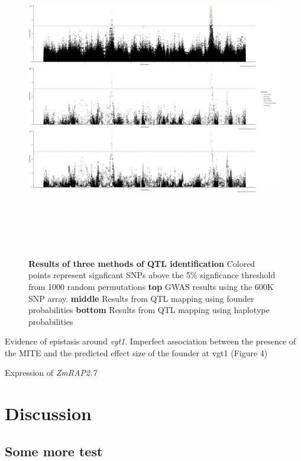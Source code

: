 \documentclass[article,9pt,twocolumn,twoside]{rilabRxiv}
\begin{document}
\begin{figure}[hb!]
\includegraphics[width=\textwidth,height=14cm]{figures/Methods_Fig3.png}
\caption{\textbf{Results of three methods of QTL identification} Colored points represent signficant SNPs above the 5\% signficance threshold from 1000 random permutations \textbf{top} GWAS results using the 600K SNP array. \textbf{middle} Results from QTL mapping using founder probabilities \textbf{bottom} Results from QTL mapping using haplotype probabilities}
\label{fig:figure3}
\end{figure}

Evidence of epistasis around \emph{vgt1}. Imperfect association between the presence of the MITE and the predicted effect size of the founder at vgt1 (Figure 4)


Expression of \emph{ZmRAP2.7}


\section{Discussion}
\subsection{Some more test}
\blindtext
\blindtext
\end{document}
